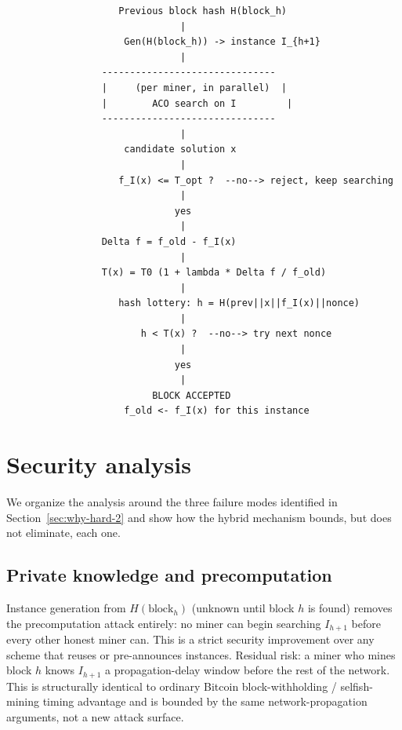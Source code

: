 \documentclass[journal]{IEEEtran}
\begin{document}
\begin{verbatim}
                    Previous block hash H(block_h)
                               |
                     Gen(H(block_h)) -> instance I_{h+1}
                               |
                 -------------------------------
                 |     (per miner, in parallel)  |
                 |        ACO search on I         |
                 -------------------------------
                               |
                     candidate solution x
                               |
                    f_I(x) <= T_opt ?  --no--> reject, keep searching
                               |
                              yes
                               |
                 Delta f = f_old - f_I(x)
                               |
                 T(x) = T0 (1 + lambda * Delta f / f_old)
                               |
                    hash lottery: h = H(prev||x||f_I(x)||nonce)
                               |
                        h < T(x) ?  --no--> try next nonce
                               |
                              yes
                               |
                          BLOCK ACCEPTED
                     f_old <- f_I(x) for this instance
\end{verbatim}

\section{Security analysis}
\label{sec:security}

We organize the analysis around the three failure modes identified in
Section~\ref{sec:why-hard-2} and show how the hybrid mechanism bounds, but does
not eliminate, each one.

\subsection{Private knowledge and precomputation}
Instance generation from $H(\text{block}_h)$ (unknown until block $h$ is
found) removes the precomputation attack entirely: no miner can begin
searching $I_{h+1}$ before every other honest miner can. This is a strict
security improvement over any scheme that reuses or pre-announces instances.
Residual risk: a miner who mines block $h$ knows $I_{h+1}$ a propagation-delay
window before the rest of the network. This is structurally identical to
ordinary Bitcoin block-withholding / selfish-mining timing advantage and is
bounded by the same network-propagation arguments, not a new attack surface.
\end{document}
